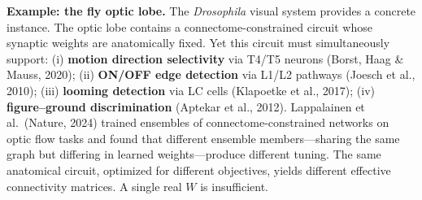 \documentclass[11pt]{article}
\begin{document}
\textbf{Example: the fly optic lobe.} The \emph{Drosophila} visual system provides a concrete instance. The optic lobe contains a connectome-constrained circuit whose synaptic weights are anatomically fixed. Yet this circuit must simultaneously support:
(i) \textbf{motion direction selectivity} via T4/T5 neurons (Borst, Haag \& Mauss, 2020);
(ii) \textbf{ON/OFF edge detection} via L1/L2 pathways (Joesch et al., 2010);
(iii) \textbf{looming detection} via LC cells (Klapoetke et al., 2017);
(iv) \textbf{figure--ground discrimination} (Aptekar et al., 2012). Lappalainen et al.\ (Nature, 2024) trained ensembles of connectome-constrained networks on optic flow tasks and found that different ensemble members---sharing the same graph but differing in learned weights---produce different tuning. The same anatomical circuit, optimized for different objectives, yields different effective connectivity matrices. A single real $W$ is insufficient.
\end{document}

